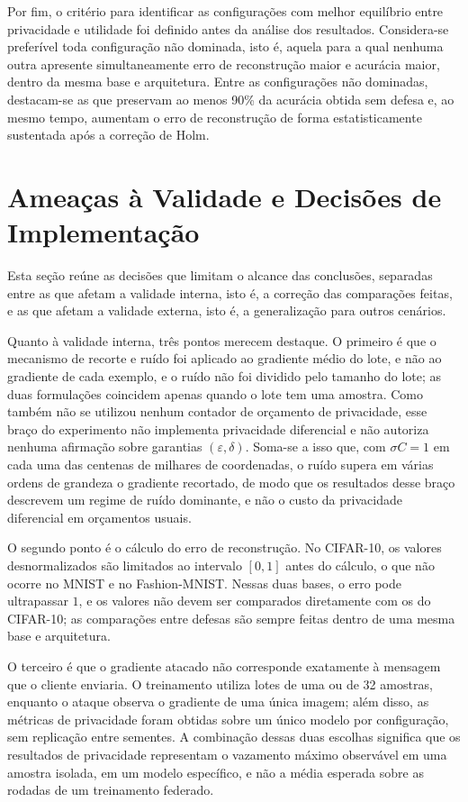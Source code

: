 Por fim, o critério para identificar as configurações com melhor equilíbrio entre privacidade e utilidade foi definido antes da análise dos resultados. Considera-se preferível toda configuração não dominada, isto é, aquela para a qual nenhuma outra apresente simultaneamente erro de reconstrução maior e acurácia maior, dentro da mesma base e arquitetura. Entre as configurações não dominadas, destacam-se as que preservam ao menos 90\% da acurácia obtida sem defesa e, ao mesmo tempo, aumentam o erro de reconstrução de forma estatisticamente sustentada após a correção de Holm.

\section{Ameaças à Validade e Decisões de Implementação} \label{sec:ameacas-validade}

Esta seção reúne as decisões que limitam o alcance das conclusões, separadas entre as que afetam a validade interna, isto é, a correção das comparações feitas, e as que afetam a validade externa, isto é, a generalização para outros cenários.

Quanto à validade interna, três pontos merecem destaque. O primeiro é que o mecanismo de recorte e ruído foi aplicado ao gradiente médio do lote, e não ao gradiente de cada exemplo, e o ruído não foi dividido pelo tamanho do lote; as duas formulações coincidem apenas quando o lote tem uma amostra. Como também não se utilizou nenhum contador de orçamento de privacidade, esse braço do experimento não implementa privacidade diferencial e não autoriza nenhuma afirmação sobre garantias $(\varepsilon, \delta)$. Soma-se a isso que, com $\sigma C = 1$ em cada uma das centenas de milhares de coordenadas, o ruído supera em várias ordens de grandeza o gradiente recortado, de modo que os resultados desse braço descrevem um regime de ruído dominante, e não o custo da privacidade diferencial em orçamentos usuais.

O segundo ponto é o cálculo do erro de reconstrução. No CIFAR-10, os valores desnormalizados são limitados ao intervalo $[0, 1]$ antes do cálculo, o que não ocorre no MNIST e no Fashion-MNIST. Nessas duas bases, o erro pode ultrapassar $1$, e os valores não devem ser comparados diretamente com os do CIFAR-10; as comparações entre defesas são sempre feitas dentro de uma mesma base e arquitetura.

O terceiro é que o gradiente atacado não corresponde exatamente à mensagem que o cliente enviaria. O treinamento utiliza lotes de uma ou de 32 amostras, enquanto o ataque observa o gradiente de uma única imagem; além disso, as métricas de privacidade foram obtidas sobre um único modelo por configuração, sem replicação entre sementes. A combinação dessas duas escolhas significa que os resultados de privacidade representam o vazamento máximo observável em uma amostra isolada, em um modelo específico, e não a média esperada sobre as rodadas de um treinamento federado.

